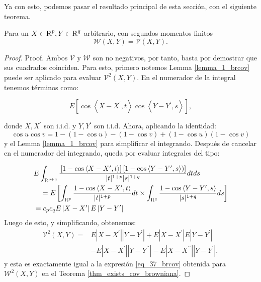 	Ya con esto, podemos pasar el resultado principal de esta secci\'on, con el siguiente teorema.
	

	\begin{thm}\label{thm_8_brcov}
		Para un $X \in \textsc{R}^p, Y \in \textsc{R}^q$ arbitrario, con segundos momentos finitos
			$$
			\mathcal{W}(X, Y)=\mathcal{V}(X, Y) .
			$$
			\end{thm}
	
	\begin{proof}
		
	Proof. Ambos $\mathcal{V}$ y $\mathcal{W}$ son no negativos, por tanto, basta por demostrar que sus cuadrados coinciden. Para esto, primero notemos Lemma \ref{lemma_1_brcov} puede ser aplicado para evaluar $\mathcal{V}^2(X, Y)$. En el numerador de la integral tenemos t\'erminos como:
	
	$$
	E\left[\cos \left\langle X-X^{\prime}, t\right\rangle \cos \left\langle Y-Y^{\prime}, s\right\rangle\right],
	$$

	donde $X, X^{\prime}$ son i.i.d. y $Y, Y^{\prime}$ son i.i.d. Ahora, aplicando la identidad:
	$$
	\cos u \cos v=1-(1-\cos u)-(1-\cos v)+(1-\cos u)(1-\cos v)
	$$
	y el Lemma \ref{lemma_1_brcov} para simplificar el integrando. Despu\'es de cancelar en el numerador del integrando, queda por evaluar integrales del tipo:

	$$
	\begin{aligned}
	& E \int_{\textsc{R}^{p+q}} \frac{\left.\left[1-\cos \left\langle X-X^{\prime}, t\right\rangle\right]\left[1-\cos \left\langle Y-Y^{\prime}, s\right\rangle\right)\right]}{|t|^{1+p}|s|^{1+q}} d t d s \\
	& \quad=E\left[\int_{\textsc{R}^p} \frac{1-\cos \left\langle X-X^{\prime}, t\right\rangle}{|t|^{1+p}} d t \times \int_{\textsc{R}^q} \frac{1-\cos \left\langle Y-Y^{\prime}, s\right\rangle}{|s|^{1+q}} d s\right] \\
	& =c_p c_q E\left|X-X^{\prime}\right| E\left|Y-Y^{\prime}\right|
	\end{aligned}
	$$
	Luego de esto, y simplificando, obtenemos:
	$$
	\begin{aligned}
	\mathcal{V}^2(X, Y)= & E\left|X-X^{\prime}\right|\left|Y-Y^{\prime}\right|+E\left|X-X^{\prime}\right| E\left|Y-Y^{\prime}\right| \\
	& -E\left|X-X^{\prime}\right|\left|Y-Y^{\prime \prime}\right|-E\left|X-X^{\prime \prime}\right|\left|Y-Y^{\prime}\right|,
	\end{aligned}
	$$
	y esta es exactamente igual a la expresi\'on \ref{eq_37_brcov} obtenida para $\mathcal{W}^2(X, Y)$ en el Teorema \ref{thm_exists_cov_browniana}.
	\end{proof}

